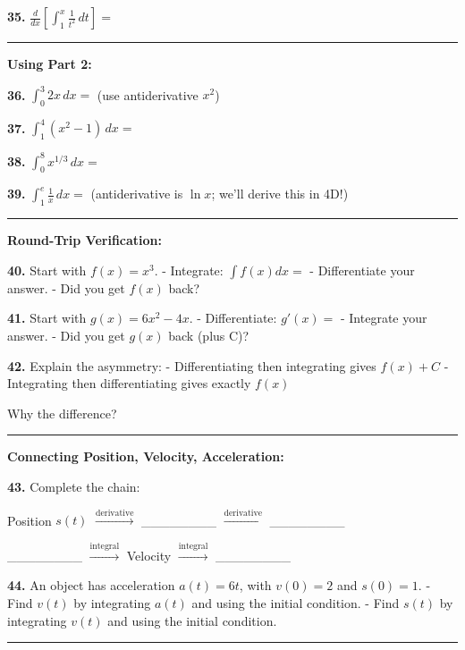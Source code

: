 \documentclass[
  11pt,
]{article}
\begin{document}
\textbf{35.}
\(\frac{d}{dx}\left[\int_1^x \frac{1}{t^2} \, dt\right] ={}\)

\begin{center}\rule{0.5\linewidth}{0.5pt}\end{center}

\textbf{Using Part 2:}

\textbf{36.} \(\int_0^3 2x \, dx ={}\) (use antiderivative \(x^2\))

\textbf{37.} \(\int_1^4 (x^2 - 1) \, dx ={}\)

\textbf{38.} \(\int_0^8 x^{1/3} \, dx ={}\)

\textbf{39.} \(\int_1^e \frac{1}{x} \, dx ={}\) (antiderivative is
\(\ln x\); we'll derive this in 4D!)

\begin{center}\rule{0.5\linewidth}{0.5pt}\end{center}

\textbf{Round-Trip Verification:}

\textbf{40.} Start with \(f(x) = x^3\). - Integrate:
\(\int f(x) dx ={}\) - Differentiate your answer. - Did you get \(f(x)\)
back?

\textbf{41.} Start with \(g(x) = 6x^2 - 4x\). - Differentiate:
\(g'(x) ={}\) - Integrate your answer. - Did you get \(g(x)\) back (plus
C)?

\textbf{42.} Explain the asymmetry: - Differentiating then integrating
gives \(f(x) + C\) - Integrating then differentiating gives exactly
\(f(x)\)

Why the difference?

\begin{center}\rule{0.5\linewidth}{0.5pt}\end{center}

\textbf{Connecting Position, Velocity, Acceleration:}

\textbf{43.} Complete the chain:

Position \(s(t)\) \(\xrightarrow{\text{derivative}}\) \_\_\_\_\_\_\_\_
\(\xrightarrow{\text{derivative}}\) \_\_\_\_\_\_\_\_

\_\_\_\_\_\_\_\_ \(\xrightarrow{\text{integral}}\) Velocity
\(\xrightarrow{\text{integral}}\) \_\_\_\_\_\_\_\_

\textbf{44.} An object has acceleration \(a(t) = 6t\), with \(v(0) = 2\)
and \(s(0) = 1\). - Find \(v(t)\) by integrating \(a(t)\) and using the
initial condition. - Find \(s(t)\) by integrating \(v(t)\) and using the
initial condition.

\begin{center}\rule{0.5\linewidth}{0.5pt}\end{center}
\end{document}
